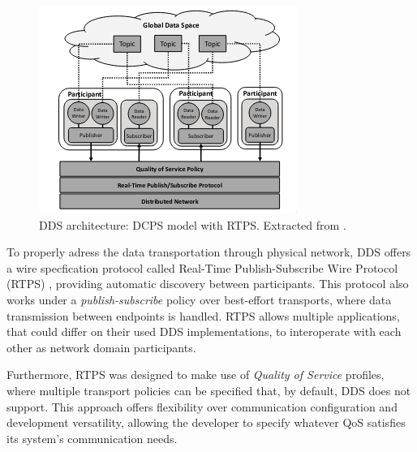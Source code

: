 \begin{figure}[H]
    \centering
    \includegraphics[width=0.6\linewidth]{images/dcps-model.png}
    \caption{DDS architecture: DCPS model with RTPS. Extracted from \cite{maruyama2016exploring}.}
    \label{fig:dcps-model}
\end{figure}

To properly adress the data transportation through physical network, DDS offers a wire specfication protocol called Real-Time Publish-Subscribe Wire Protocol (RTPS) \cite{rtps}, providing automatic discovery between participants. This protocol also works under a \textit{publish-subscribe} policy over best-effort transports, where data transmission between endpoints is handled. \cite{yun2017data} RTPS allows multiple applications, that could differ on their used DDS implementations, to interoperate with each other as network domain participants. \cite{dcps-rtps, alaerjan2017modeling} %

Furthermore, RTPS was designed to make use of \textit{Quality of Service} profiles, where multiple transport policies can be specified that, by default, DDS does not support. This approach offers flexibility over communication configuration and development versatility, allowing the developer to specify whatever QoS satisfies its system's communication needs. \cite{alaerjan2017modeling, diluoffo2018robot, maruyama2016exploring} %


